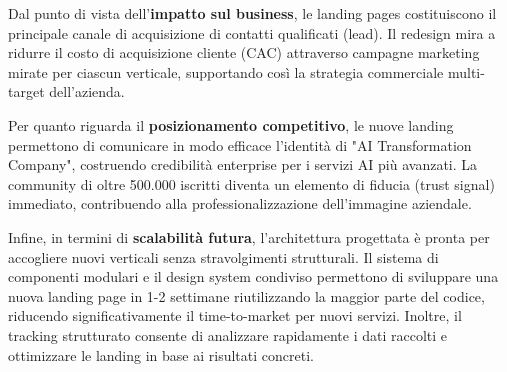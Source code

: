 \medskip
Dal punto di vista dell'\textbf{impatto sul business}, le landing pages 
costituiscono il principale canale di acquisizione di contatti qualificati 
(lead). Il redesign mira a ridurre il costo di acquisizione cliente (CAC) 
attraverso campagne marketing mirate per ciascun verticale, supportando 
così la strategia commerciale multi-target dell'azienda.

\medskip
Per quanto riguarda il \textbf{posizionamento competitivo}, le nuove 
landing permettono di comunicare in modo efficace l'identità di 
"AI Transformation Company", costruendo credibilità enterprise per i 
servizi AI più avanzati. La community di oltre 500.000 iscritti diventa 
un elemento di fiducia (trust signal) immediato, contribuendo alla 
professionalizzazione dell'immagine aziendale.

\medskip
Infine, in termini di \textbf{scalabilità futura}, l'architettura 
progettata è pronta per accogliere nuovi verticali senza stravolgimenti 
strutturali. Il sistema di componenti modulari e il design system condiviso permettono 
di sviluppare una nuova landing page in 1-2 settimane riutilizzando la 
maggior parte del codice, riducendo significativamente il time-to-market 
per nuovi servizi. Inoltre, 
il tracking strutturato consente di analizzare rapidamente i dati raccolti 
e ottimizzare le landing in base ai risultati concreti.